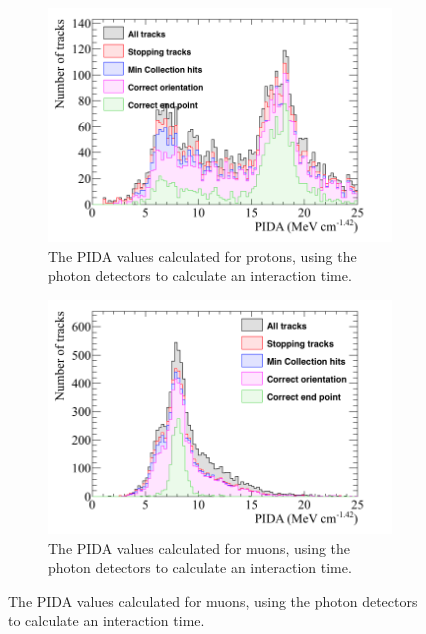 \begin{figure}
  \centering
  \begin{subfigure}{0.48\textwidth}
        \centering
        \includegraphics[width=\textwidth]{ProtonEnrich_500V_v05_14_00_trackpmtrackT0_MinTrCut_MCCont_Proton_PIDA}
        \caption{The PIDA values calculated for protons, using the photon detectors to calculate an interaction time.}
        \label{fig:CRY_PIDACheat_Proton_NonCheat}
  \end{subfigure}%
  \hspace{0.03\textwidth}%
  \begin{subfigure}{0.48\textwidth}
        \centering
        \includegraphics[width=\textwidth]{ProtonEnrich_500V_v05_14_00_trackpmtrackT0_MinTrCut_MCCont_Muon_PIDA}
        \caption{The PIDA values calculated for muons, using the photon detectors to calculate an interaction time.}

\end{subfigure}
\end{figure}
